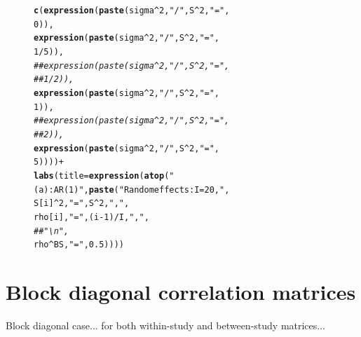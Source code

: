 \documentclass{article}\usepackage[]{graphicx}\usepackage[]{color}
\makeatletter
\newcommand{\hlnum}[1]{\textcolor[rgb]{0.686,0.059,0.569}{#1}}%
\newcommand{\hlstr}[1]{\textcolor[rgb]{0.192,0.494,0.8}{#1}}%
\newcommand{\hlcom}[1]{\textcolor[rgb]{0.678,0.584,0.686}{\textit{#1}}}%
\newcommand{\hlopt}[1]{\textcolor[rgb]{0,0,0}{#1}}%
\newcommand{\hlstd}[1]{\textcolor[rgb]{0.345,0.345,0.345}{#1}}%
\newcommand{\hlkwc}[1]{\textcolor[rgb]{0.333,0.667,0.333}{#1}}%
\newcommand{\hlkwd}[1]{\textcolor[rgb]{0.737,0.353,0.396}{\textbf{#1}}}%
\newenvironment{kframe}{%
 \def\at@end@of@kframe{}%
 \ifinner\ifhmode%
  \def\at@end@of@kframe{\end{minipage}}%
  \begin{minipage}{\columnwidth}%
 \fi\fi%
 \def\FrameCommand##1{\hskip\@totalleftmargin \hskip-\fboxsep
 \colorbox{shadecolor}{##1}\hskip-\fboxsep
     \hskip-\linewidth \hskip-\@totalleftmargin \hskip\columnwidth}%
 \MakeFramed {\advance\hsize-\width
   \@totalleftmargin\z@ \linewidth\hsize
   \@setminipage}}%
 {\par\unskip\endMakeFramed%
 \at@end@of@kframe}
\newenvironment{knitrout}{}{} %
\makeatother
\begin{document}
\begin{figure}[h]
\begin{knitrout}
\begin{kframe}
\begin{alltt}
                         \hlkwd{c}\hlstd{(}\hlkwd{expression}\hlstd{(}\hlkwd{paste}\hlstd{(sigma}\hlopt{^}\hlnum{2}\hlstd{,} \hlstr{"/"}\hlstd{, S}\hlopt{^}\hlnum{2}\hlstd{,} \hlstr{"="}\hlstd{,}
                                            \hlnum{0}\hlstd{)),}
                           \hlkwd{expression}\hlstd{(}\hlkwd{paste}\hlstd{(sigma}\hlopt{^}\hlnum{2}\hlstd{,} \hlstr{"/"}\hlstd{, S}\hlopt{^}\hlnum{2}\hlstd{,} \hlstr{"="}\hlstd{,}
                                            \hlnum{1}\hlopt{/}\hlnum{5}\hlstd{)),}
                           \hlcom{##expression(paste(sigma^2, "/", S^2, "=",}
                           \hlcom{##                1/2)),}
                           \hlkwd{expression}\hlstd{(}\hlkwd{paste}\hlstd{(sigma}\hlopt{^}\hlnum{2}\hlstd{,} \hlstr{"/"}\hlstd{, S}\hlopt{^}\hlnum{2}\hlstd{,} \hlstr{"="}\hlstd{,}
                                            \hlnum{1}\hlstd{)),}
                           \hlcom{##expression(paste(sigma^2, "/", S^2, "=",}
                           \hlcom{##                 2)),}
                           \hlkwd{expression}\hlstd{(}\hlkwd{paste}\hlstd{(sigma}\hlopt{^}\hlnum{2}\hlstd{,} \hlstr{"/"}\hlstd{, S}\hlopt{^}\hlnum{2}\hlstd{,} \hlstr{"="}\hlstd{,}
                                            \hlnum{5}\hlstd{))))} \hlopt{+}
  \hlkwd{labs}\hlstd{(}\hlkwc{title}\hlstd{=}\hlkwd{expression}\hlstd{(}\hlkwd{atop}\hlstd{(}\hlstr{"(a): AR(1)"}\hlstd{,} \hlkwd{paste}\hlstd{(}\hlstr{"Random effects: I = 20, "}\hlstd{,}
                                          \hlstd{S[i]}\hlopt{^}\hlnum{2}\hlstd{,} \hlstr{" = "}\hlstd{, S}\hlopt{^}\hlnum{2}\hlstd{,} \hlstr{", "}\hlstd{,}
                                          \hlstd{rho[i],} \hlstr{" = "}\hlstd{, (i}\hlopt{-}\hlnum{1}\hlstd{)}\hlopt{/}\hlstd{I,} \hlstr{", "}\hlstd{,}
                                          \hlcom{##"\textbackslash{}n",}
                                          \hlstd{rho}\hlopt{^}\hlstd{BS,} \hlstr{" = "}\hlstd{,} \hlnum{0.5}\hlstd{))))}
\end{alltt}
\end{kframe}
\end{knitrout}
\end{figure}

\section{Block diagonal correlation matrices}

Block diagonal case... for both within-study and between-study matrices...
\end{document}
